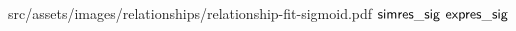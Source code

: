 
\relatplot
{src/assets/images/relationships/relationship-fit-sigmoid.pdf}
{$\mathsf{simres\_sig}$}
{$\mathsf{expres\_sig}$}